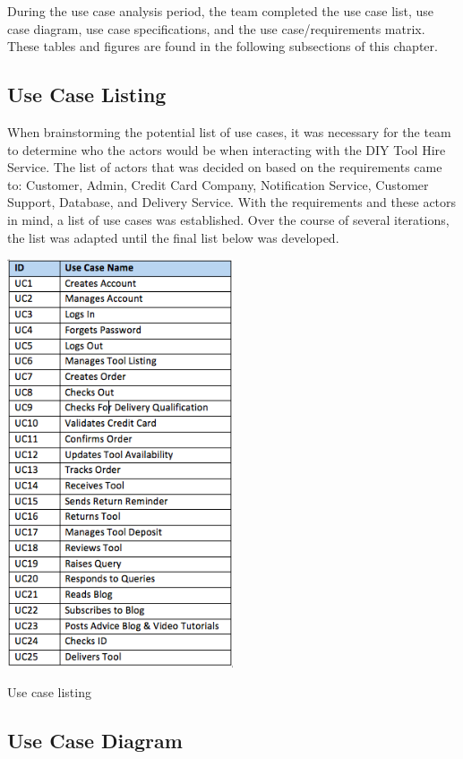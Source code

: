\documentclass[fontsize=11pt]{extarticle}
\numberwithin{figure}{section} %
\numberwithin{table}{section}%
\begin{document}
During the use case analysis period, the team completed the use case
list, use case diagram, use case specifications, and the use
case/requirements matrix. These tables and figures are found in the
following subsections of this chapter.

\hypertarget{use-case-listing}{%
\subsection{Use Case Listing}\label{use-case-listing}}

When brainstorming the potential list of use cases, it was necessary for
the team to determine who the actors would be when interacting with the
DIY Tool Hire Service. The list of actors that was decided on based on
the requirements came to: Customer, Admin, Credit Card Company,
Notification Service, Customer Support, Database, and Delivery Service.
With the requirements and these actors in mind, a list of use cases was
established. Over the course of several iterations, the list was adapted
until the final list below was developed.

\begin{table}[H]
      \centering
      \includegraphics[trim = 0 0 0 0, clip, width=0.5\textwidth]{TempImg/UCListing.png}
      \caption{Use case listing}
 \end{table}

\hypertarget{use-case-diagram}{%
\subsection{Use Case Diagram}\label{use-case-diagram}}
\end{document}
